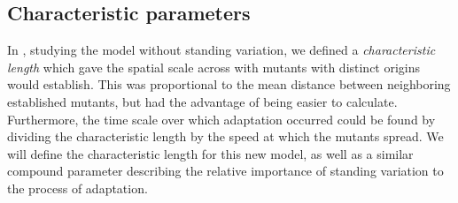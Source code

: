 \documentclass{article}
\begin{document}






\subsection{Characteristic parameters}


In \citet{ralph2010parallel}, studying the model without standing variation,
we defined a {\em characteristic length} which gave the spatial scale across with mutants with distinct origins would establish.
This was proportional to the mean distance between neighboring established mutants,
but had the advantage of being easier to calculate.
Furthermore, the time scale over which adaptation occurred could be found by dividing the characteristic length 
by the speed at which the mutants spread.
We will define the characteristic length for this new model,
as well as a similar compound parameter describing the relative importance of standing variation to the process of adaptation.
\end{document}
